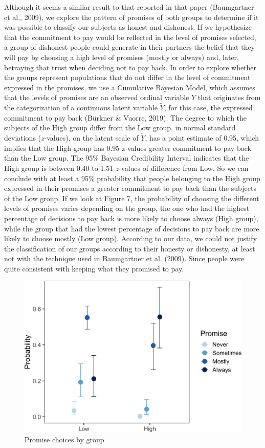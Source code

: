 \documentclass[12pt,]{article}
\begin{document}
Although it seems a similar result to that reported in that paper
(Baumgartner et al., 2009), we explore the pattern of promises of both
groups to determine if it was possible to classify our subjects as
honest and dishonest. If we hypothesize that the commitment to pay would
be reflected in the level of promises selected, a group of dishonest
people could generate in their partners the belief that they will pay by
choosing a high level of promises (mostly or always) and, later,
betraying that trust when deciding not to pay back. In order to explore
whether the groups represent populations that do not differ in the level
of commitment expressed in the promises, we use a Cumulative Bayesian
Model, which assumes that the levels of promises are an observed ordinal
variable \(Y\) that originates from the categorization of a continuous
latent variable \(\tilde{Y}\), for this case, the expressed commitment
to pay back (Bürkner \& Vuorre, 2019). The degree to which the subjects
of the High group differ from the Low group, in normal standard
deviations (\(z\)-values), on the latent scale of \(\tilde{Y}\), has a
point estimate of 0.95, which implies that the High group has 0.95
z-values greater commitment to pay back than the Low group. The 95\%
Bayesian Credibility Interval indicates that the High group is between
0.40 to 1.51 \(z\)-values of difference from Low. So we can conclude
with at least a 95\% probability that people belonging to the High group
expressed in their promises a greater commitment to pay back than the
subjects of the Low group. If we look at Figure 7, the probability of
choosing the different levels of promises varies depending on the group,
the one who had the highest percentage of decisions to pay back is more
likely to choose always (High group), while the group that had the
lowest percentage of decisions to pay back are more likely to choose
mostly (Low group). According to our data, we could not justify the
classification of our groups according to their honesty or dishonesty,
at least not with the technique used in Baumgartner et al. (2009). Since
people were quite consistent with keeping what they promised to pay.

\begin{figure}

{\centering \includegraphics[width=0.8\linewidth]{article_english_files/figure-latex/fig7-1} 

}

\caption{Promise choices by group}\label{fig:fig7}
\end{figure}
\end{document}
